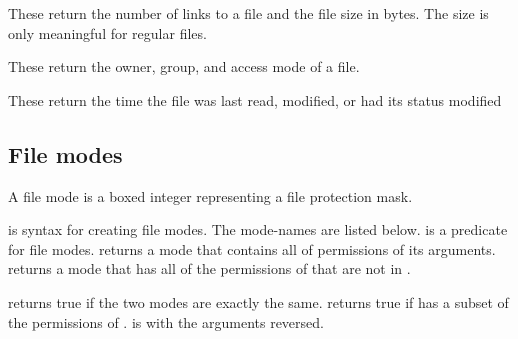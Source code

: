 \begin{protos}
\end{protos}
\noindent
These return the number of links to a file and the file size in bytes.
The size is only meaningful for regular files.

\begin{protos}
\end{protos}
\noindent
These return the owner, group, and access mode of a file.

\begin{protos}
\end{protos}
\noindent
These return the time the file was last read, modified, or had its
 status modified

\subsection{File modes}

A file mode is a boxed integer representing a file protection mask.

\begin{protos}
\end{protos}
\noindent
{} is syntax for creating file modes.
The mode-names are listed below.
 is a predicate for file modes.
 returns a mode that contains all of permissions of
 its arguments.
 returns a mode that has all of the permissions of
  that are not in .

\begin{protos}
\end{protos}
\noindent
{} returns true if the two modes are exactly the same.
 returns true if  has a subset
 of the permissions of .
 is  with the arguments reversed.

